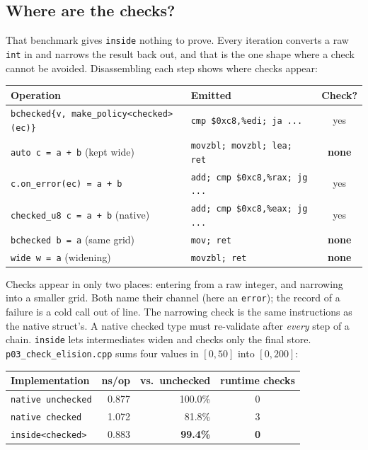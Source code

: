 \documentclass[11pt,a4paper]{article}
\newcommand{\code}[1]{\texttt{\small #1}}
\newcommand{\file}[1]{\texttt{\small #1}}
\begin{document}
\subsection{Where are the checks?}\label{sec:checks}

That benchmark gives \code{inside} nothing to prove. Every iteration converts
a raw \code{int} in and narrows the result back out, and that is the one shape
where a check cannot be avoided. Disassembling each step shows where checks
appear:

\begin{center}
\small
\begin{tabular}{@{}l l c@{}}
\toprule
Operation & Emitted & Check? \\
\midrule
\code{bchecked\{v, make\_policy<checked>(ec)\}} & \code{cmp \$0xc8,\%edi; ja ...} & yes \\
\code{auto c = a + b} (kept wide) & \code{movzbl; movzbl; lea; ret} & \textbf{none} \\
\code{c.on\_error(ec) = a + b}    & \code{add; cmp \$0xc8,\%rax; jg ...} & yes \\
\code{checked\_u8 c = a + b} (native) & \code{add; cmp \$0xc8,\%eax; jg ...} & yes \\
\code{bchecked b = a} (same grid)  & \code{mov; ret} & \textbf{none} \\
\code{wide w = a} (widening)       & \code{movzbl; ret} & \textbf{none} \\
\bottomrule
\end{tabular}
\end{center}

\noindent
Checks appear in only two places: entering from a raw integer, and narrowing
into a smaller grid. Both name their channel (here an \code{error}); the record
of a failure is a cold call out of line. The narrowing check is the same instructions as the native
struct's. A native checked type must re-validate after \emph{every} step of a
chain. \code{inside} lets intermediates widen and checks only the final store.
\file{p03\_check\_elision.cpp} sums four values in $[0,50]$ into $[0,200]$:

\begin{center}
\small
\begin{tabular}{@{}l r r c@{}}
\toprule
Implementation & ns/op & vs.\ unchecked & runtime checks \\
\midrule
\code{native unchecked}  & 0.877 & 100.0\% & 0 \\
\code{native checked}    & 1.072 &  81.8\% & 3 \\
\code{inside<checked>}   & 0.883 &  \textbf{99.4\%} & \textbf{0} \\
\bottomrule
\end{tabular}
\end{center}
\end{document}
